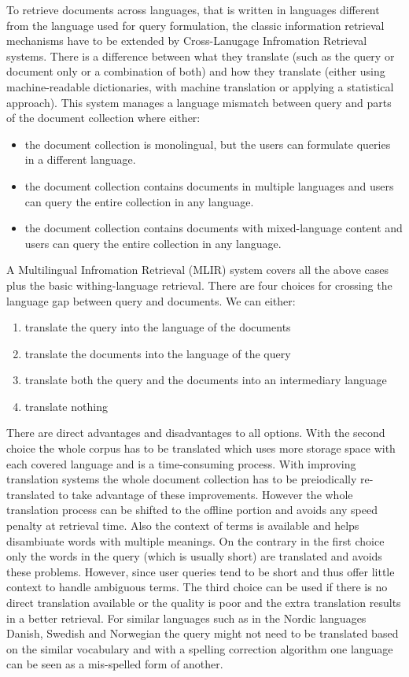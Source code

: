 \documentclass[journal]{IEEEtran}
\begin{document}
To retrieve documents across languages, that is written in languages different from the language used for query formulation, the classic information retrieval mechanisms have to be extended by Cross-Lanugage Infromation Retrieval systems. There is a difference between what they translate (such as the query or document only or a combination of both) and how they translate (either using machine-readable dictionaries, with machine translation or applying a statistical approach). This system manages a language mismatch between query and parts of the document collection where either:
\begin{itemize}
	\item the document collection is monolingual, but the users can formulate queries in a different language.
	\item the document collection contains documents in multiple languages and users can query the entire collection in any language.
	\item the document collection contains documents with mixed-language content and users can query the entire collection in any language.
\end{itemize}
A Multilingual Infromation Retrieval (MLIR) system covers all the above cases plus the basic withing-language retrieval. There are four choices for crossing the language gap between query and documents. We can either:
\begin{enumerate}
	\item translate the query into the language of the documents
	\item translate the documents into the language of the query
	\item translate both the query and the documents into an intermediary language
	\item translate nothing
\end{enumerate}
There are direct advantages and disadvantages to all options. With the second choice the whole corpus has to be translated which uses more storage space with each covered language and is a time-consuming process. With improving translation systems the whole document collection has to be preiodically re-translated to take advantage of these improvements. However the whole translation process can be shifted to the offline portion and avoids any speed penalty at retrieval time. Also the context of terms is available and helps disambiuate words with multiple meanings. On the contrary in the first choice only the words in the query (which is usually short) are translated and avoids these problems. However, since user queries tend to be short and thus offer little context to handle ambiguous terms. The third choice can be used if there is no direct translation available or the quality is poor and the extra translation results in a better retrieval. For similar languages such as in the Nordic languages Danish, Swedish and Norwegian the query might not need to be translated based on the similar vocabulary and with a spelling correction algorithm one language can be seen as a mis-spelled form of another.
\end{document}
